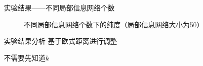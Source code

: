 \documentclass[14pt]{beamer}
\begin{document}
\begin{frame}{实验结果——不同局部信息网络个数}
\begin{figure}
  \centering
\caption{不同局部信息网络个数下的纯度（局部信息网络大小为50）}
\end{figure}
\end{frame}


\begin{frame}{实验结果分析}
基于欧式距离进行调整 \pause

不需要先知道$k$
\end{frame}


\end{document}
